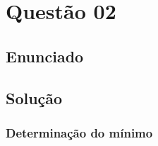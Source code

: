 \documentclass[10pt, a4paper]{article}
\begin{document}
\section{Questão 02}

\subsection{Enunciado}

\lipsum[1-2]

\subsection{Solução}

\subsubsection{Determinação do mínimo}
\end{document}
